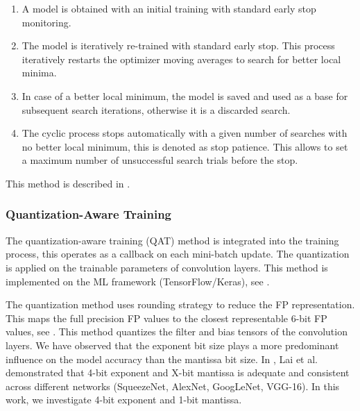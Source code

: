 \begin{enumerate}
	\item A model is obtained with an initial training with standard early stop monitoring.
	\item The model is iteratively re-trained with standard early stop. This process iteratively restarts the optimizer moving averages to search for better local minima.
	\item In case of a better local minimum, the model is saved and used as a base for subsequent search iterations, otherwise it is a discarded search.
	\item The cyclic process stops automatically with a given number of searches with no better local minimum, this is denoted as stop patience. This allows to set a maximum number of unsuccessful search trials before the stop.
\end{enumerate}

This method is described in .

\subsubsection{Quantization-Aware Training}
The quantization-aware training (QAT) method is integrated into the training process, this operates as a callback on each mini-batch update. The quantization is applied on the trainable parameters of convolution layers. This method is implemented on the ML framework (TensorFlow/Keras), see .

The quantization method uses rounding strategy to reduce the FP representation. This maps the full precision FP values to the closest representable 6-bit FP values, see . This method quantizes the filter and bias tensors of the convolution layers. We have observed that the exponent bit size plays a more predominant influence on the model accuracy than the mantissa bit size. In \cite{lai2017deep}, Lai et al. demonstrated that 4-bit exponent and X-bit mantissa is adequate and consistent across different networks (SqueezeNet, AlexNet, GoogLeNet, VGG-16). In this work, we investigate 4-bit exponent and 1-bit mantissa.

